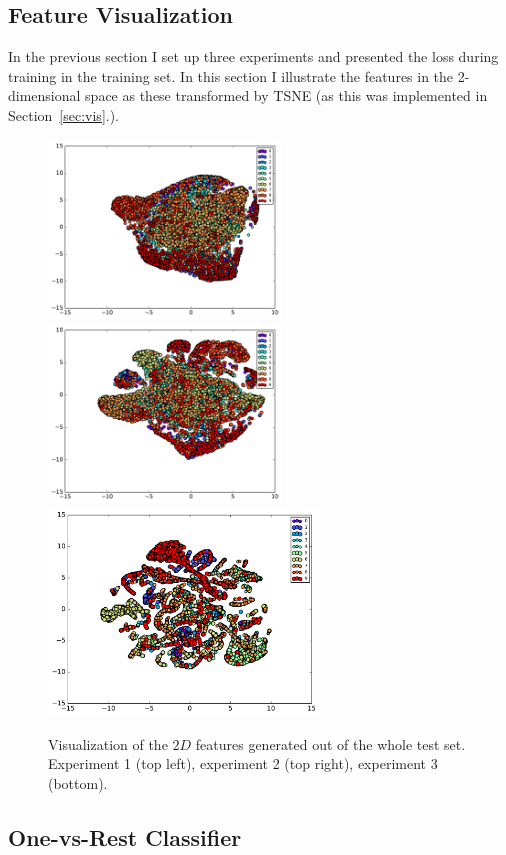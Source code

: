 \documentclass{article}
\begin{document}
\subsection{Feature Visualization}

In the previous section I set up three experiments and presented the loss during training in the training set.
In this section I illustrate the features in the 2-dimensional space as these transformed by TSNE (as this was implemented in Section~\ref{sec:vis}.).


\begin{figure}[h!]
\centering
\includegraphics[width=6.2cm]{visualization-siamese-plain.pdf}
\includegraphics[width=6.2cm]{visualization-siamese-1.pdf}
\includegraphics[width=7.2cm]{visualization-siamese-3.pdf}
\caption{Visualization of the $2D$ features generated out of the whole test set. Experiment 1 (top left), experiment 2 (top right), experiment 3 (bottom).}
\label{fig:features}
\end{figure}


\subsection{One-vs-Rest Classifier}
\end{document}

